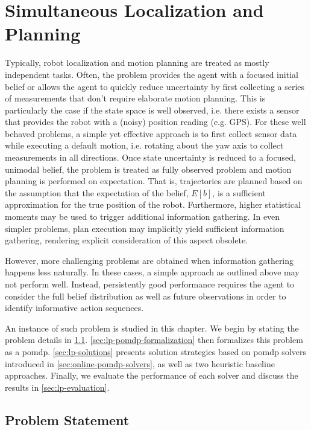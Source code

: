 \chapter{Simultaneous Localization and Planning}\label{chap:localization-and-planning}

Typically, robot localization and motion planning are treated as mostly
independent tasks. Often, the problem provides the agent with a focused initial
belief or allows the agent to quickly reduce uncertainty by first collecting
a series of measurements that don't require elaborate motion planning. This is
particularly the case if the state space is well observed, i.e. there exists
a sensor that provides the robot with a (noisy) position reading (e.g. GPS).
For these well behaved problems, a simple yet effective approach is to first
collect sensor data while executing a default motion, i.e. rotating about the
yaw axis to collect measurements in all directions. Once state uncertainty is
reduced to a focused, unimodal belief, the problem is treated as fully observed
problem and motion planning is performed on expectation. That is, trajectories
are planned based on the assumption that the expectation of the belief, $E[b]$,
is a sufficient approximation for the true position of the robot. Furthermore,
higher statistical moments  may be used
to trigger additional information gathering. In even simpler problems, plan
execution may implicitly yield sufficient information gathering, rendering
explicit consideration of this aspect obsolete.

However, more challenging problems are obtained when information gathering
happens less naturally. In these cases, a simple approach as outlined above
may not perform well. Instead, persistently good performance requires the agent
to consider the full belief distribution as well as future observations in
order to identify informative action sequences.

An instance of such problem is studied in this chapter. We begin by stating the
problem details in \cref{sec:lp-problem-statement}.
\cref{sec:lp-pomdp-formalization} then formalizes this problem as a \ac{pomdp}.
\cref{sec:lp-solutions} presents solution strategies based on \ac{pomdp}
solvers introduced in \cref{sec:online-pomdp-solvers}, as well as two heuristic
baseline approaches. Finally, we evaluate the performance of each solver and
discuss the results in \cref{sec:lp-evaluation}.

\section{Problem Statement}\label{sec:lp-problem-statement}

